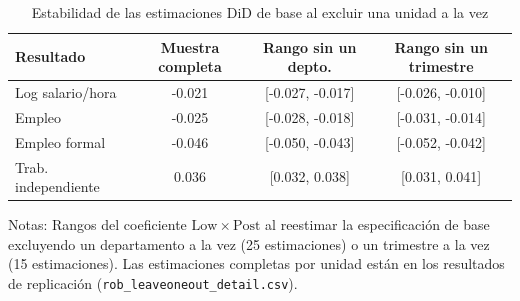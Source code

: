 \begin{table}[!tbp]\centering
\caption{Estabilidad de las estimaciones DiD de base al excluir una unidad a la vez}\label{tab:loo}
\begin{threeparttable}
\begin{tabular}{lccc}
\toprule
Resultado & Muestra completa & Rango sin un depto. & Rango sin un trimestre \\
\midrule
Log salario/hora & -0.021 & [-0.027, -0.017] & [-0.026, -0.010] \\
Empleo & -0.025 & [-0.028, -0.018] & [-0.031, -0.014] \\
Empleo formal & -0.046 & [-0.050, -0.043] & [-0.052, -0.042] \\
Trab. independiente & 0.036 & [0.032, 0.038] & [0.031, 0.041] \\
\bottomrule
\end{tabular}
\begin{tablenotes}\footnotesize
\item Notas: Rangos del coeficiente $\mathrm{Low}\times\mathrm{Post}$ al reestimar la especificación de base excluyendo un departamento a la vez (25 estimaciones) o un trimestre a la vez (15 estimaciones). Las estimaciones completas por unidad están en los resultados de replicación (\texttt{rob\_leaveoneout\_detail.csv}).
\end{tablenotes}
\end{threeparttable}\end{table}
